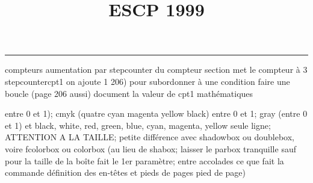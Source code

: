 \documentclass[11pt]{article}%
\title{\bf \vspace{-2cm} ESCP 1999} %
\author{} %
\date{} %
\renewcommand{\headrulewidth}{0pt}%
\renewcommand{\footrulewidth}{0.4pt}%
\begin{document}
\maketitle %
\vspace{-1.4cm}\hrule %
\thispagestyle{fancy}

\vspace*{.2cm}



compteurs%
aumentation par stepcounter du compteur section%
met le compteur à 3%
stepcounter{cpt1} on ajoute 1%
206) pour subordonner à une condition %
faire une boucle (page 206 aussi) %
document la valeur de cpt1 
mathématiques\newcommand{\ch}{\operatorname{ch}} 
\newcommand{\sh}{\operatorname{sh}}
\renewcommand{\tanh}{\operatorname{th}}
\renewcommand{\sinh}{\operatorname{sh}}
\renewcommand{\cosh}{\operatorname{ch}}
\newcommand{\argsh}{\operatorname{argsh}}
\newcommand{\argch}{\operatorname{argch}}
\newcommand{\argth}{\operatorname{argth}}
\newcommand{\ker}{\operatorname{Ker}}
\renewcommand{\im}{\operatorname{Im}}
\newcommand{\rg}{\operatorname{rg}}
\newcommand{\Id}{\operatorname{Id}}
\newcommand{\id}{\operatorname{id}}
\renewcommand{\leq}{\leq}
\renewcommand{\geq}{\geq }

entre 0 et 1); cmyk (quatre cyan magenta yellow black) entre 0 et 1;
gray (entre 0 et 1) et black, white, red, green, blue, cyan, magenta,
yellow%
seule ligne; ATTENTION A LA TAILLE; petite différence avec shadowbox ou
doublebox, voire fcolorbox ou colorbox (au lieu de shabox; laisser le
parbox tranquille sauf pour la taille de la boîte
\newcommand{\Tbox}[1]{\begin{center} \shabox{\parbox{0.6
\linewidth}{#1}} \end{center}} %
fait le 1er paramètre; entre accolades ce que fait la commande
définition des en-têtes et pieds de pages\pagestyle{fancy}
\chead{}
\rfoot[ \ \thepage]{\thepage}
\cfoot{}
\lfoot{}
\thispagestyle{fancy} %
pied de page)\renewcommand{\footrulewidth}{0.4pt}
\renewcommand{\headrulewidth}{0.4pt}
\end{document}
